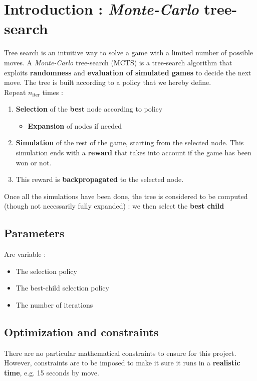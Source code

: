 \documentclass[11pt,a4paper]{article}
\begin{document}
\newpage
\tableofcontents

 

\section{Introduction : \textit{Monte-Carlo} tree-search}
Tree search is an intuitive way to solve a game with a limited number of possible moves. A \textit{Monte-Carlo} tree-search (MCTS) is a tree-search algorithm that exploits \textbf{randomness} and \textbf{evaluation of simulated games} to decide the next move. The tree is built according to a policy that we hereby define.\\

Repeat $n_{\text{iter}}$ times : 
\begin{enumerate}
    \item \textbf{Selection} of the \textbf{best} node according to policy  
    \begin{itemize}[label=$\blacktriangleright$]
        \item \textbf{Expansion} of nodes if needed
    \end{itemize}
    \item \textbf{Simulation} of the rest of the game, starting from the selected node. This simulation ends with a \textbf{reward} that takes into account if the game has been won or not.
    \item This reward is \textbf{backpropagated} to the selected node. 
\end{enumerate}
Once all the simulations have been done, the tree is considered to be computed (though not necessarily fully expanded) : we then select the \textbf{best child}\\

\subsection{Parameters}
Are variable :
\begin{itemize}
    \item The selection policy
    \item The best-child selection policy
    \item The number of iterations
\end{itemize}

\subsection{Optimization and constraints}
There are no particular mathematical constraints to ensure for this project. However, constraints are to be imposed to make it sure it runs in a \textbf{realistic time}, e.g. 15 seconds by move. \\
\end{document}
